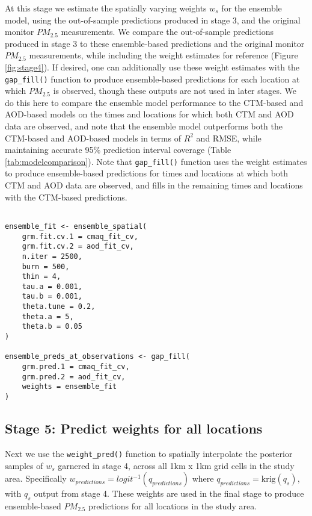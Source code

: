 \documentclass[12pt]{article}
\begin{document}
At this stage we estimate the spatially varying weights $w_s$ for the ensemble model, using the out-of-sample predictions produced in stage 3, and the original monitor $PM_{2.5}$ measurements.
We compare the out-of-sample predictions produced in stage 3 to these ensemble-based predictions and the original monitor $PM_{2.5}$ measurements, while including the weight estimates for reference (Figure \ref{fig:stage4}).
If desired, one can additionally use these weight estimates with the \texttt{gap\_fill()} function to produce ensemble-based predictions for each location at which $PM_{2.5}$ is observed, though these outputs are not used in later stages. 
We do this here to compare the ensemble model performance to the CTM-based and AOD-based models on the times and locations for which both CTM and AOD data are observed, and note that the ensemble model outperforms both the CTM-based and AOD-based models in terms of $R^2$ and RMSE, while maintaining accurate 95\% prediction interval coverage (Table \ref{tab:modelcomparison}).
Note that \texttt{gap\_fill()} function uses the weight estimates to produce ensemble-based predictions for times and locations at which both CTM and AOD data are observed, and fills in the remaining times and locations with the CTM-based predictions.

\begin{lstlisting}

ensemble_fit <- ensemble_spatial(
    grm.fit.cv.1 = cmaq_fit_cv,
    grm.fit.cv.2 = aod_fit_cv,
    n.iter = 2500,
    burn = 500,
    thin = 4,
    tau.a = 0.001,
    tau.b = 0.001,
    theta.tune = 0.2,
    theta.a = 5,
    theta.b = 0.05
)

ensemble_preds_at_observations <- gap_fill(
    grm.pred.1 = cmaq_fit_cv,
    grm.pred.2 = aod_fit_cv,
    weights = ensemble_fit
)

\end{lstlisting}

\subsection*{Stage 5: Predict weights for all locations}

Next we use the \texttt{weight\_pred()} function to spatially interpolate the posterior samples of $w_s$ garnered in stage 4, across all 1km x 1km grid cells in the study area. 
Specifically $w_{predictions} = logit^{-1}(q_{predictions})$ where $q_{predictions} = \text{krig}(q_s)$, with $q_s$ output from stage 4.
These weights are used in the final stage to produce ensemble-based $PM_{2.5}$ predictions for all locations in the study area.
\end{document}
